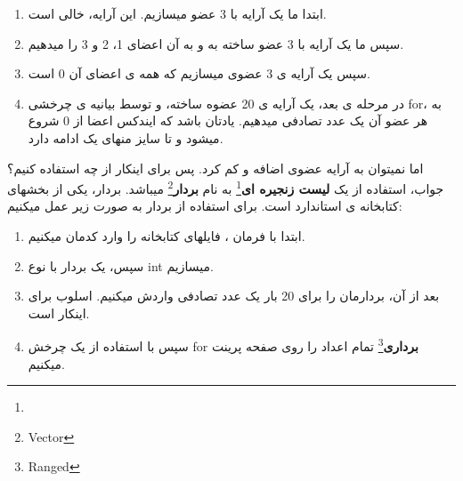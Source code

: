 \documentclass[14pt,a4paper]{memoir}
\begin{document}
	 
	 
	 \begin{enumerate}
	 	\item ابتدا ما یک آرایه  با 3 عضو میسازیم. این آرایه، خالی است.
	 	\item سپس ما یک آرایه با 3 عضو ساخته به و به آن اعضای 1، 2 و 3 را میدهیم.
	 	\item  سپس یک آرایه ی 3 عضوی میسازیم که همه ی اعضای آن 0 است.
	 	
	 	\item  در مرحله ی بعد، یک آرایه ی 20 عضوه ساخته، و توسط بیانیه ی چرخشی for، به هر عضو آن یک عدد تصادفی میدهیم. یادتان باشد که ایندکس اعضا از 0 شروع میشود و تا سایز منهای یک ادامه دارد.
	 \end{enumerate}
 
 اما نمیتوان به آرایه عضوی اضافه و کم کرد. پس برای اینکار از چه استفاده کنیم؟ جواب، استفاده از یک \textbf{لیست زنجیره ای}\footnote{} به نام \textbf{بردار}\footnote{Vector} میباشد. بردار، یکی از بخشهای کتابخانه ی استاندارد است. برای استفاده از بردار به صورت زیر عمل میکنیم:
 
 
	 	 \begin{latin}
	 	
	 \end{latin}
	 
	 
	 \begin{enumerate}
	 	\item  ابتدا با فرمان ، فایلهای کتابخانه را وارد کدمان میکنیم.
	 	\item  سپس، یک بردار با نوع int میسازیم. 
	 	\item  بعد از آن، بردارمان را برای 20 بار یک عدد تصادفی واردش میکنیم. اسلوب  برای اینکار است.
	 	\item سپس با استفاده از یک چرخش forِ \textbf{برداری}\footnote{Ranged} تمام اعداد را روی صفحه پرینت میکنیم.
	 \end{enumerate}
 
\end{document}
